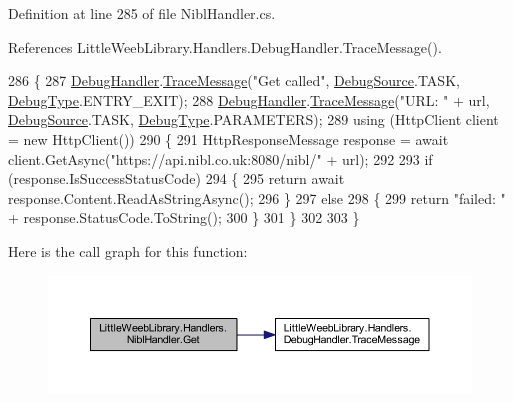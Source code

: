 Definition at line 285 of file Nibl\+Handler.\+cs.



References Little\+Weeb\+Library.\+Handlers.\+Debug\+Handler.\+Trace\+Message().


\begin{DoxyCode}
286         \{
287             \mbox{\hyperlink{class_little_weeb_library_1_1_handlers_1_1_nibl_handler_a334c2111588fa71d1203bd8cbb572970}{DebugHandler}}.\mbox{\hyperlink{interface_little_weeb_library_1_1_handlers_1_1_i_debug_handler_a2e405bc3492e683cd3702fae125221bc}{TraceMessage}}(\textcolor{stringliteral}{"Get called"}, 
      \mbox{\hyperlink{namespace_little_weeb_library_1_1_handlers_a2a6ca0775121c9c503d58aa254d292be}{DebugSource}}.TASK, \mbox{\hyperlink{namespace_little_weeb_library_1_1_handlers_ab66019ed40462876ec4e61bb3ccb0a62}{DebugType}}.ENTRY\_EXIT);
288             \mbox{\hyperlink{class_little_weeb_library_1_1_handlers_1_1_nibl_handler_a334c2111588fa71d1203bd8cbb572970}{DebugHandler}}.\mbox{\hyperlink{interface_little_weeb_library_1_1_handlers_1_1_i_debug_handler_a2e405bc3492e683cd3702fae125221bc}{TraceMessage}}(\textcolor{stringliteral}{"URL: "} + url, 
      \mbox{\hyperlink{namespace_little_weeb_library_1_1_handlers_a2a6ca0775121c9c503d58aa254d292be}{DebugSource}}.TASK, \mbox{\hyperlink{namespace_little_weeb_library_1_1_handlers_ab66019ed40462876ec4e61bb3ccb0a62}{DebugType}}.PARAMETERS);
289             \textcolor{keyword}{using} (HttpClient client = \textcolor{keyword}{new} HttpClient())
290             \{
291                 HttpResponseMessage response = await client.GetAsync(\textcolor{stringliteral}{"https://api.nibl.co.uk:8080/nibl/"} + 
      url);
292 
293                 \textcolor{keywordflow}{if} (response.IsSuccessStatusCode)
294                 \{
295                     \textcolor{keywordflow}{return} await response.Content.ReadAsStringAsync();
296                 \}
297                 \textcolor{keywordflow}{else}
298                 \{
299                     \textcolor{keywordflow}{return} \textcolor{stringliteral}{"failed: "} + response.StatusCode.ToString();
300                 \}
301             \}
302 
303         \}
\end{DoxyCode}
Here is the call graph for this function\+:\nopagebreak
\begin{figure}[H]
\begin{center}
\leavevmode
\includegraphics[width=350pt]{class_little_weeb_library_1_1_handlers_1_1_nibl_handler_a2989b180582fadd05111d010c0700411_cgraph}
\end{center}
\end{figure}


